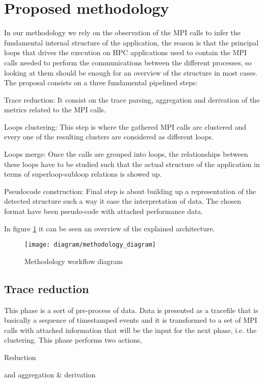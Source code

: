 \section{Proposed methodology}

In our methodology we rely on the observation of the MPI calls to infer the
fundamental internal structure of the application, the reason is that the
principal loops that drives the execution on HPC applications used to contain
the MPI calls needed to perform the communications between the different
processes, so looking at them should be enough for an overview of the structure
in most cases. The proposal consists on a three fundamental pipelined steps:
\begin{enumerate*}[label=\roman*)]
  \item Trace reduction: It consist on the trace parsing, aggregation and
    derivation of the metrics related to the MPI calls.
  \item Loops clustering: This step is where the gathered MPI calls are
    clustered and every one of the resulting clusters are considered as different
    loops.
  \item Loops merge: Once the calls are grouped into loops, the relationships
    between these loops have to be studied such that the actual structure of the
    application in terms of superloop-subloop relations is showed up.
  \item Pseudocode construction: Final step is about building up a
    representation of the detected structure such a way it ease the
    interpretation of data. The chosen format have been pseudo-code with
    attached performance data.
\end{enumerate*}
In figure \ref{fig:methodology_workdlow} it can be seen an overview of the 
explained architecture.

\begin{figure}[]
  \centering
  \texttt{[image: diagram/methodology\_diagram]}
  \caption{Methodology workflow diagram}
  \label{fig:methodology_workdlow}
\end{figure}

\subsection{Trace reduction}\label{ss:trace_reduction}

This phase is a sort of pre-process of data. Data is presented as a tracefile
that is basically a sequence of timestamped events and it is transformed to a
set of MPI calls with attached information that will be the input for the next
phase, i.e. the clustering. This phase performs two actions,
\begin{enumerate*}[label=\roman*)]
  \item Reduction
  \item and aggregation \& derivation
\end{enumerate*}

